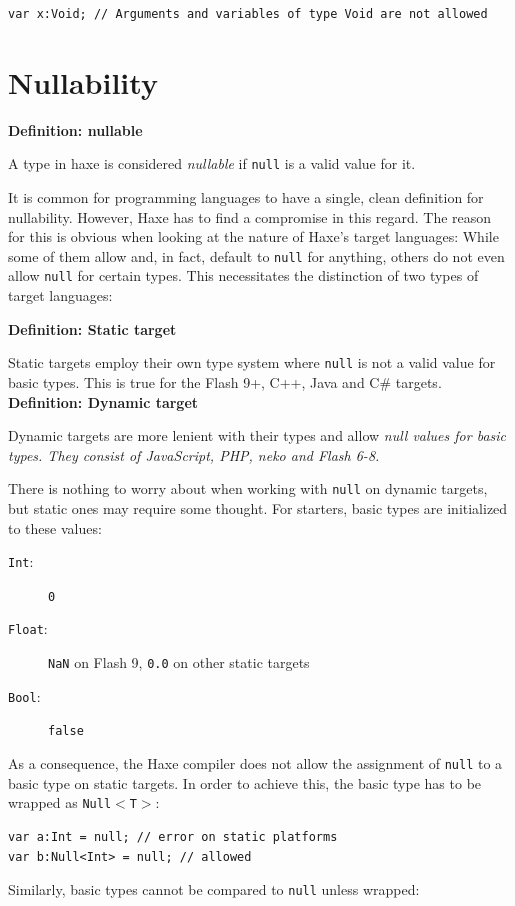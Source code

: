 \documentclass[a4paper,oneside]{book}
\newcommand{\target}[1]{#1}
\newcommand{\type}[1]{\texttt{#1}}
\newcommand{\expr}[1]{\texttt{#1}}
\newenvironment{myshaded}
  {\def\FrameCommand{\fboxsep=\topsep\colorbox{bgcolor}}%
  \MakeFramed {\advance\hsize-\width \FrameRestore}}%
 {\endMakeFramed}
\newcommand{\define}[3][Definition]
	{\begin{myshaded}\noindent\textbf{#1: #2}\par\nobreak\noindent\ignorespaces#3\label{def:#2}\end{myshaded}}
\begin{document}
\begin{lstlisting}
var x:Void; // Arguments and variables of type Void are not allowed
\end{lstlisting}




\section{Nullability}
\label{types-nullability}

\define{nullable}{A type in haxe is considered \emph{nullable} if \expr{null} is a valid value for it.}

It is common for programming languages to have a single, clean definition for nullability. However, Haxe has to find a compromise in this regard. The reason for this is obvious when looking at the nature of Haxe's target languages: While some of them allow and, in fact, default to \expr{null} for anything, others do not even allow \expr{null} for certain types. This necessitates the distinction of two types of target languages:

\define{Static target}{Static targets employ their own type system where \expr{null} is not a valid value for basic types. This is true for the \target{Flash 9+}, \target{C++}, \target{Java} and \target{C\#} targets.}
\define{Dynamic target}{Dynamic targets are more lenient with their types and allow \it{null} values for basic types. They consist of \target{JavaScript}, \target{PHP}, \target{neko} and \target{Flash 6-8}.}

There is nothing to worry about when working with \expr{null} on dynamic targets, but static ones may require some thought. For starters, basic types are initialized to these values:

\begin{description}
	\item[\type{Int}:] \expr{0}
	\item[\type{Float}:] \expr{NaN} on \target{Flash 9}, \expr{0.0} on other static targets
	\item[\type{Bool}:] \expr{false}
\end{description}
As a consequence, the Haxe compiler does not allow the assignment of \expr{null} to a basic type on static targets. In order to achieve this, the basic type has to be wrapped as \type{Null$<$T$>$}:

\begin{lstlisting}
var a:Int = null; // error on static platforms
var b:Null<Int> = null; // allowed
\end{lstlisting}
Similarly, basic types cannot be compared to \expr{null} unless wrapped:
\end{document}
